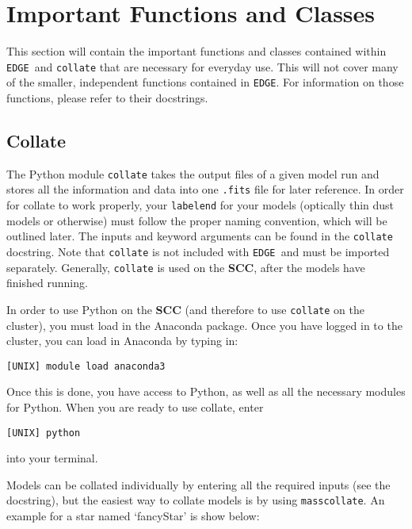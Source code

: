 \documentclass{article}
\newcommand{\edge}{\texttt{EDGE }}
\begin{document}
 
\section{Important Functions and Classes} \label{functions}

This section will contain the important functions and classes contained within \edge and \texttt{collate} that are necessary for everyday use. This will not cover many of the smaller, independent functions contained in \texttt{EDGE}. For information on those functions, please refer to their docstrings. 
 
\subsection{Collate}
 
The Python module \texttt{collate} takes the output files of a given model run and stores all the information and data into one \texttt{.fits} file for later reference. In order for collate to work properly, your \texttt{labelend} for your models (optically thin dust models or otherwise) must follow the proper naming convention, which will be outlined later. The inputs and keyword arguments can be found in the \texttt{collate} docstring. Note that \texttt{collate} is not included with \edge and must be imported separately. 
Generally, \texttt{collate} is used on the \textbf{SCC}, after the models have finished running. 

In order to use Python on the \textbf{SCC} (and therefore to use \texttt{collate} on the cluster), you must load in the Anaconda package. Once you have logged in to the cluster, you can load in Anaconda by typing in: 

\vspace{2mm}
\texttt{[UNIX] module load anaconda3}
\vspace{2mm}

\noindent Once this is done, you have access to Python, as well as all the necessary modules for Python. When you are ready to use collate, enter 

\vspace{2mm}
\texttt{[UNIX] python} 
\vspace{2mm}

\noindent into your terminal.

Models can be collated individually by entering all the required inputs (see the docstring), but the easiest way to collate models is by using \texttt{masscollate}. An example for a star named `fancyStar' is show below:
\end{document}
